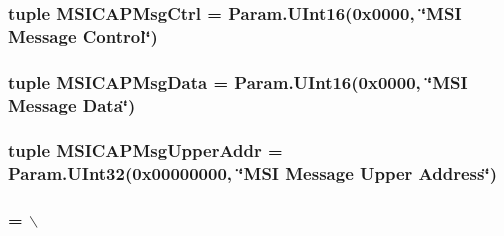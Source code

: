 \label{classPci_1_1PciDevice_ab1a9538764c92af9e4b58fa1889c816a}
\hypertarget{classPci_1_1PciDevice_a8e794db7345ad700d23b46e9b7b7adcf}{
\subsubsection[{MSICAPMsgCtrl}]{\setlength{\rightskip}{0pt plus 5cm}tuple {\bf MSICAPMsgCtrl} = Param.UInt16(0x0000, \char`\"{}MSI Message Control\char`\"{})}}
\label{classPci_1_1PciDevice_a8e794db7345ad700d23b46e9b7b7adcf}
\hypertarget{classPci_1_1PciDevice_aeb2bb99ab6d72270f3767fa2aa4dd4a5}{
\subsubsection[{MSICAPMsgData}]{\setlength{\rightskip}{0pt plus 5cm}tuple {\bf MSICAPMsgData} = Param.UInt16(0x0000, \char`\"{}MSI Message Data\char`\"{})}}
\label{classPci_1_1PciDevice_aeb2bb99ab6d72270f3767fa2aa4dd4a5}
\hypertarget{classPci_1_1PciDevice_aad615796a9eb2e4f0a7b23a6de466f5a}{
\subsubsection[{MSICAPMsgUpperAddr}]{\setlength{\rightskip}{0pt plus 5cm}tuple {\bf MSICAPMsgUpperAddr} = Param.UInt32(0x00000000, \char`\"{}MSI Message Upper Address\char`\"{})}}
\label{classPci_1_1PciDevice_aad615796a9eb2e4f0a7b23a6de466f5a}
\hypertarget{classPci_1_1PciDevice_a4f1b67a85cdaf32ce2e152793bcae158}{
\subsubsection[{MSICAPNextCapability}]{ = $\backslash$}}
